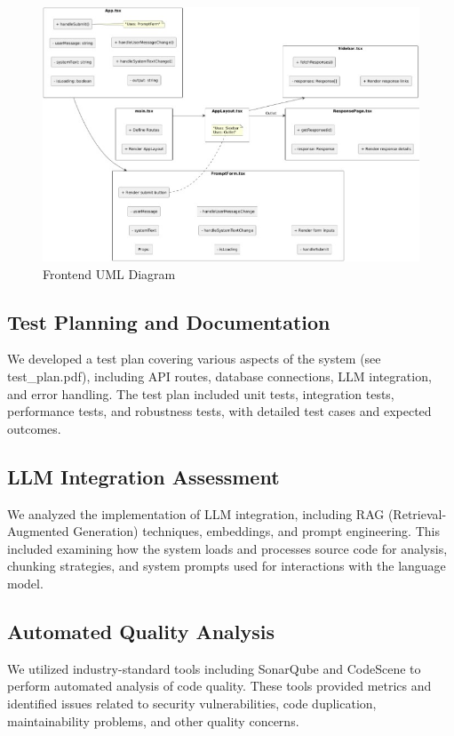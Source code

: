 \documentclass[sigconf]{acmart}
\begin{document}
\begin{figure}[htbp]
    \centering
    \includegraphics[width=1\linewidth]{FrontUML.jpg}
    \caption{Frontend UML Diagram}
    \label{fig:figure2}
\end{figure}

\subsection{Test Planning and Documentation}
We developed a test plan covering various aspects of the system (see test\_plan.pdf), including API routes, database connections, LLM integration, and error handling. The test plan included unit tests, integration tests, performance tests, and robustness tests, with detailed test cases and expected outcomes.

\subsection{LLM Integration Assessment}
We analyzed the implementation of LLM integration, including RAG (Retrieval-Augmented Generation) techniques, embeddings, and prompt engineering. This included examining how the system loads and processes source code for analysis, chunking strategies, and system prompts used for interactions with the language model.

\subsection{Automated Quality Analysis}
We utilized industry-standard tools including SonarQube and CodeScene to perform automated analysis of code quality. These tools provided metrics and identified issues related to security vulnerabilities, code duplication, maintainability problems, and other quality concerns.
\end{document}
